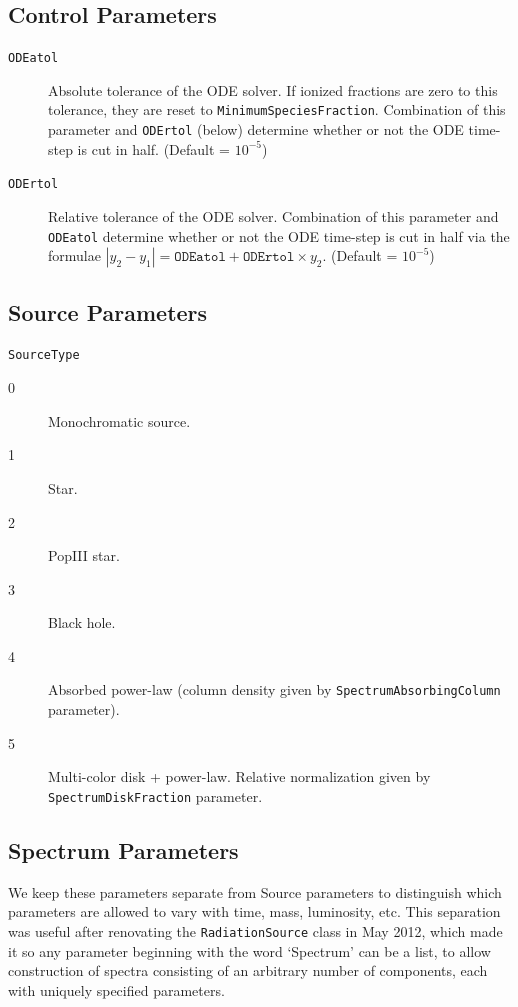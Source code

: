 \documentclass[letterpaper,titlepage,12pt]{article}
\numberwithin{equation}{section}
\begin{document}
\subsection{Control Parameters}

\begin{description}
    
\item [\texttt{ODEatol}] Absolute tolerance of the ODE solver.  If ionized fractions are zero to this tolerance, they are reset to \texttt{MinimumSpeciesFraction}.  Combination of this parameter and \texttt{ODErtol} (below) determine whether or not the ODE time-step is cut in half. (Default = $10^{-5}$)

\item [\texttt{ODErtol}]
Relative tolerance of the ODE solver.  Combination of this parameter and \texttt{ODEatol} determine whether or not the ODE time-step is cut in half via the formulae $|y_2 - y_1| = \texttt{ODEatol} + \texttt{ODErtol}\times y_2$. (Default = $10^{-5}$)
 

\end{description}


\subsection{Source Parameters}

\begin{description}
    
\item \texttt{SourceType}
\begin{description}
    \item [0] Monochromatic source.
    \item [1] Star.  
    \item [2] PopIII star.  
    \item [3] Black hole.        
    \item [4] Absorbed power-law (column density given by \texttt{SpectrumAbsorbingColumn} parameter).
    \item [5] Multi-color disk + power-law. Relative normalization given by \texttt{SpectrumDiskFraction} parameter.                
\end{description}    
\end{description}

\subsection{Spectrum Parameters}
We keep these parameters separate from Source parameters to distinguish which parameters are allowed to vary with time, mass, luminosity, etc.  This separation was useful after renovating the \texttt{RadiationSource} class in May 2012, which made it so any parameter beginning with the word `Spectrum' can be a list, to allow construction of spectra consisting of an arbitrary number of components, each with uniquely specified parameters.
\end{document}
